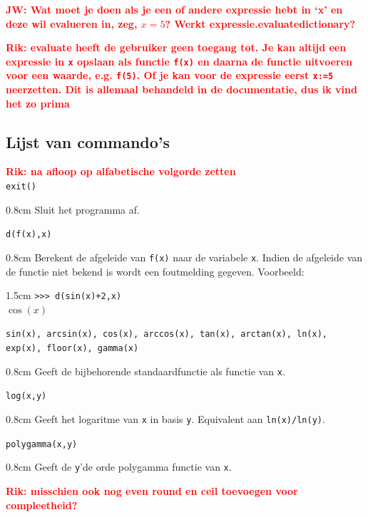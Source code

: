 \documentclass[a4paper]{article}
\newcommand{\rcom}[1]{\textbf{\textcolor{red}{#1}}}
\newcommand{\com}[2]{\texttt{#1}\mbox{}\vspace{-2ex}\begin{adjustwidth}{0.8cm}{} #2 \end{adjustwidth}}
\newcommand{\ttt}[1]{\texttt{#1}}
\begin{document}
\rcom{JW: Wat moet je doen als je een of andere expressie hebt in `x' en deze wil evalueren in, zeg, $x=5$? Werkt expressie.evaluate{dictionary}?}	

\rcom{Rik: evaluate heeft de gebruiker geen toegang tot. Je kan altijd een expressie in \ttt{x} opslaan als functie \ttt{f(x)} en daarna de functie uitvoeren voor een waarde, e.g. \ttt{f(5)}. Of je kan voor de expressie eerst \ttt{x:=5} neerzetten. Dit is allemaal behandeld in de documentatie, dus ik vind het zo prima}


\subsection{Lijst van commando's}
\rcom{Rik: na afloop op alfabetische volgorde zetten\\}
\com{exit()}{Sluit het programma af.}
\com{d(f(x),x)}{Berekent de afgeleide van \texttt{f(x)} naar de variabele \texttt{x}. Indien de afgeleide van de functie niet bekend is wordt een foutmelding gegeven. Voorbeeld:\vspace{-0.5ex}}
\begin{adjustwidth}{1.5cm}{}
\texttt{>>> d(sin(x)+2,x)}\\
$\cos(x)$
\end{adjustwidth}

\com{sin(x), arcsin(x), cos(x), arccos(x), tan(x), arctan(x), ln(x), exp(x), floor(x), gamma(x)}{Geeft de bijbehorende standaardfunctie als functie van \texttt{x}.}
\com{log(x,y)}{Geeft het logaritme van \texttt{x} in basis \texttt{y}. Equivalent aan \texttt{ln(x)/ln(y)}.}
\com{polygamma(x,y)}{Geeft de \texttt{y}'de orde polygamma functie van \texttt{x}.}

\rcom{Rik: misschien ook nog even round en ceil toevoegen voor compleetheid?}
\end{document}
